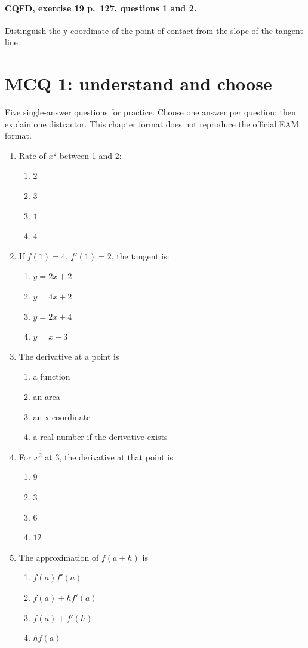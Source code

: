 \paragraph{CQFD, exercise 19 p.~127, questions 1 and 2.}\label{C04-M2} Distinguish the y-coordinate of the point of contact from the slope of the tangent line.
\begingroup\small
\clearpage\section*{MCQ 1: understand and choose}\label{C04-Q1}
Five single-answer questions for practice. Choose one answer per question; then explain one distractor. This chapter format does not reproduce the official EAM format.
\begin{enumerate}
\item Rate of $x^2$ between 1 and 2:
\begin{enumerate}[label=\Alph*.,itemsep=2pt]
\item $2$
\item $3$
\item $1$
\item $4$
\end{enumerate}
\item If $f(1)=4$, $f\prime(1)=2$, the tangent is:
\begin{enumerate}[label=\Alph*.,itemsep=2pt]
\item $y=2x+2$
\item $y=4x+2$
\item $y=2x+4$
\item $y=x+3$
\end{enumerate}
\item The derivative at a point is
\begin{enumerate}[label=\Alph*.,itemsep=2pt]
\item a function
\item an area
\item an x-coordinate
\item a real number if the derivative exists
\end{enumerate}
\item For $x^2$ at 3, the derivative at that point is:
\begin{enumerate}[label=\Alph*.,itemsep=2pt]
\item $9$
\item $3$
\item $6$
\item $12$
\end{enumerate}
\item The approximation of $f(a+h)$ is
\begin{enumerate}[label=\Alph*.,itemsep=2pt]
\item $f(a)f\prime(a)$
\item $f(a)+hf\prime(a)$
\item $f(a)+f\prime(h)$
\item $hf(a)$
\end{enumerate}
\end{enumerate}
